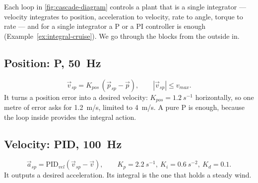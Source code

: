 Each loop in \cref{fig:cascade-diagram} controls a plant that is a single integrator — velocity integrates to position, acceleration to velocity, rate to angle, torque to rate — and for a single integrator a P or a PI controller is enough (Example~\ref{ex:integral-cruise}). We go through the blocks from the outside in.

\subsection{Position: P, \SI{50}{Hz}}
\begin{equation}
  \vec v_{sp} = K_{pos}\,(\vec p_{sp} - \vec p),\qquad |\vec v_{sp}| \le v_{max}.
\end{equation}
It turns a position error into a desired velocity: $K_{pos} = \SI{1.2}{s^{-1}}$ horizontally, so one metre of error asks for \SI{1.2}{m/s}, limited to \SI{4}{m/s}. A pure P is enough, because the loop inside provides the integral action.

\subsection{Velocity: PID, \SI{100}{Hz}}
\begin{equation}
  \vec a_{sp} = \mathrm{PID}_{vel}(\vec v_{sp} - \vec v), \qquad K_p = \SI{2.2}{s^{-1}},\ K_i = \SI{0.6}{s^{-2}},\ K_d = 0.1 .
\end{equation}
It outputs a desired acceleration. Its integral is the one that holds a steady wind.

